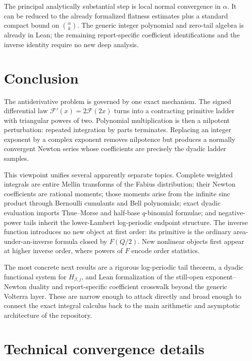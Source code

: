 \documentclass[11pt,oneside]{article}
\numberwithin{equation}{section}
\theoremstyle{definition}
\theoremstyle{remark}
\begin{document}
The principal analytically substantial step is local normal convergence in $\alpha$.  It can be
reduced to the already formalized flatness estimates plus a standard compact bound on
$\binom\alpha k$.  The generic integer polynomial and zero-tail algebra is already in Lean;
the remaining report-specific coefficient identifications and the inverse identity require
no new deep analysis.

\section{Conclusion}
\label{sec:conclusion}

The antiderivative problem is governed by one exact mechanism.  The signed differential law
$\mathcal F'(x)=2\mathcal F(2x)$ turns into a contracting primitive ladder with triangular
powers of two.  Polynomial multiplication is then a nilpotent perturbation: repeated
integration by parts terminates.  Replacing an integer exponent by a complex exponent removes
nilpotence but produces a normally convergent Newton series whose coefficients are precisely
the dyadic ladder samples.

This viewpoint unifies several apparently separate topics.  Complete weighted integrals are
entire Mellin transforms of the Fabius distribution; their Newton coefficients are rational
moments; those moments arise from the infinite sinc product through Bernoulli cumulants and
Bell polynomials; exact dyadic evaluation imports Thue--Morse and half-base $q$-binomial
formulae; and negative-power tails inherit the lower-Lambert log-periodic endpoint structure.
The inverse function introduces no new object at first order: its primitive is the ordinary
area-under-an-inverse formula closed by $F(Q/2)$.  New nonlinear objects first appear at
higher inverse order, where powers of $F$ encode order statistics.

The most concrete next results are a rigorous log-periodic tail theorem, a dyadic functional
system for $H_{\beta,j}$, and Lean formalization of the still-open exponent--Newton duality
and report-specific coefficient crosswalk beyond the generic Volterra layer.  These are
narrow enough to attack directly and broad enough to connect the exact integral calculus
back to the main arithmetic and asymptotic architecture of the repository.

\appendix

\section{Technical convergence details}
\label{app:convergence}
\end{document}
